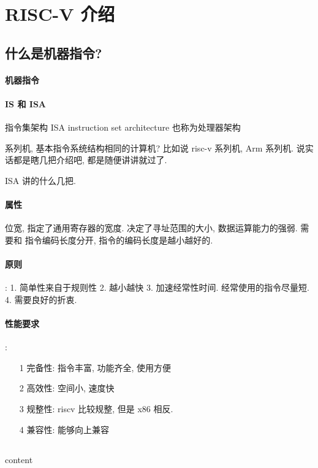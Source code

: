 \documentclass[12pt]{ctexart}
\theoremstyle{definition}
\theoremstyle{definition}
\theoremstyle{plain}
\begin{document}
\section{RISC-V 介绍}
\subsection{什么是机器指令?}



\paragraph{机器指令} 
\paragraph{IS 和 ISA}
指令集架构 ISA instruction set architecture 
也称为处理器架构

系列机, 基本指令系统结构相同的计算机? 比如说 risc-v 系列机, Arm 系列机. 说实话都是瞎几把介绍吧, 
都是随便讲讲就过了. 

ISA 
讲的什么几把. 

\paragraph{属性} 
位宽, 指定了通用寄存器的宽度. 决定了寻址范围的大小, 数据运算能力的强弱. 
需要和 指令编码长度分开, 指令的编码长度是越小越好的. 

\paragraph{原则}:
1. 简单性来自于规则性
2. 越小越快
3. 加速经常性时间.  经常使用的指令尽量短. 
4. 需要良好的折衷.

\paragraph{性能要求}: 
\begin{itemize}
\item [1] 完备性: 指令丰富, 功能齐全, 使用方便
\item [2] 高效性: 空间小, 速度快
\item [3] 规整性: riscv 比较规整, 但是 x86 相反. 
\item [4] 兼容性: 能够向上兼容
\end{itemize}

\subsection{}
content
\end{document}
